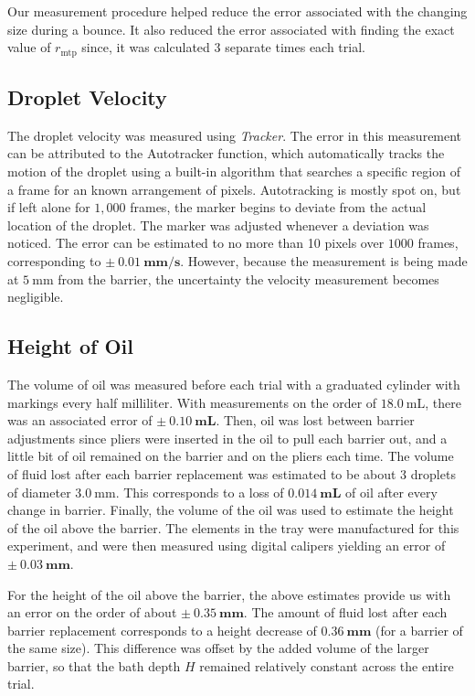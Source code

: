 Our measurement procedure helped reduce the error associated with the changing size during a bounce. It also reduced the error associated with finding the exact value of $r_\mathrm{mtp}$ since, it was calculated 3 separate times each trial.

    \subsection{Droplet Velocity}
The droplet velocity was measured using \textit{Tracker}. The error in this measurement can be attributed to the Autotracker function, which automatically tracks the motion of the droplet using a built-in algorithm that searches a specific region of a frame for an known arrangement of pixels. Autotracking is mostly spot on, but if left alone for $1,000$ frames, the marker begins to deviate from the actual location of the droplet. The marker was adjusted whenever a deviation was noticed. The error can be estimated to no more than 10 pixels over $1000$ frames, corresponding to $\mathbf{\pm~0.01~\mathrm{\textbf{mm/s}}}$. However, because the measurement is being made at $5~\mathrm{mm}$ from the barrier, the uncertainty the velocity measurement becomes negligible.
    \subsection{Height of Oil}
The volume of oil was measured before each trial with a graduated cylinder with markings every half milliliter. With measurements on the order of $18.0~\mathrm{mL}$, there was an associated error of $\mathbf{\pm~0.10~\mathrm{\textbf{mL}}}$. Then, oil was lost between barrier adjustments since pliers were inserted in the oil to pull each barrier out, and a little bit of oil remained on the barrier and on the pliers each time. The volume of fluid lost after each barrier replacement was estimated to be about 3 droplets of diameter $3.0~\mathrm{mm}$. This corresponds to a loss of $\mathbf{0.014~\mathrm{\textbf{mL}}}$ of oil after every change in barrier. Finally, the volume of the oil was used to estimate the height of the oil above the barrier. The elements in the tray were manufactured for this experiment, and were then measured using digital calipers yielding an error of $\mathbf{\pm~0.03~\mathrm{\textbf{mm}}}$. 

For the height of the oil above the barrier, the above estimates provide us with an error on the order of about $\mathbf{\pm~0.35~\mathrm{\textbf{mm}}}$. The amount of fluid lost after each barrier replacement corresponds to a height decrease of $\mathbf{0.36~\mathrm{\textbf{mm}}}$ (for a barrier of the same size). This difference was offset by the added volume of the larger barrier, so that the bath depth $H$ remained relatively constant across the entire trial. 

